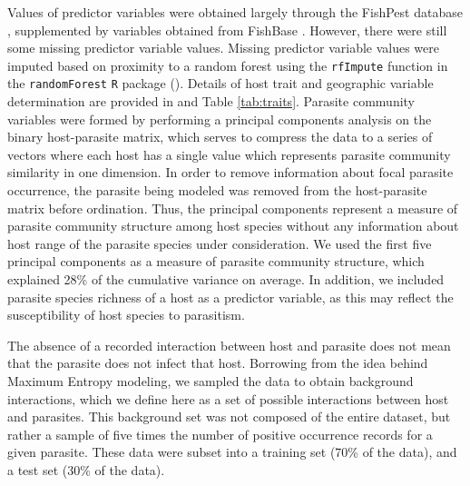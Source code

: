 \documentclass[12pt]{article}
\begin{document}
  Values of predictor variables were obtained largely through the FishPest database \cite{strona2012, strona2013}, supplemented by variables obtained from FishBase \cite{froese2010}. However, there were still some missing predictor variable values. Missing predictor variable values were imputed based on proximity to a random forest using the \texttt{rfImpute} function in the \texttt{randomForest} \texttt{R} package (\cite{randomForest}). Details of host trait and geographic variable determination are provided in \cite{strona2013} and Table \ref{tab:traits}. Parasite community variables were formed by performing a principal components analysis on the binary host-parasite matrix, which serves to compress the data to a series of vectors where each host has a single value which represents parasite community similarity in one dimension. In order to remove information about focal parasite occurrence, the parasite being modeled was removed from the host-parasite matrix before ordination. Thus, the principal components represent a measure of parasite community structure among host species without any information about host range of the parasite species under consideration. We used the first five principal components as a measure of parasite community structure, which explained 28\% of the cumulative variance on average. In addition, we included parasite species richness of a host as a predictor variable, as this may reflect the susceptibility of host species to parasitism.    
  
  The absence of a recorded interaction between host and parasite does not mean that the parasite does not infect that host. Borrowing from the idea behind Maximum Entropy modeling, we sampled the data to obtain background interactions, which we define here as a set of possible interactions between host and parasites. This background set was not composed of the entire dataset, but rather a sample of five times the number of positive occurrence records for a given parasite. These data were subset into a training set (70\% of the data), and a test set (30\% of the data). \\
   
   
\end{document}
